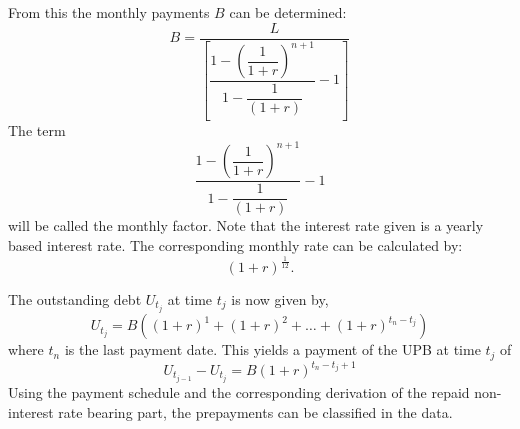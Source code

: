         From this the monthly payments $B$ can be determined: 
        \begin{equation}
            B = \dfrac{L}{
                    \left[
                        \dfrac{
                            1 - \left(
                                \dfrac{1}{1 + r}
                            \right)^{n+1}
                            }
                            {
                                1 - \dfrac{1}{(1 + r)}
                            } - 1
                    \right]        
                }
        \end{equation}
        The term 
        \begin{equation}
            \dfrac{
                1 - \left(
                    \dfrac{1}{1 + r}
                \right)^{n+1}
                }
                {
                    1 - \dfrac{1}{(1 + r)}
                } - 1
        \end{equation}
        will be called the monthly factor. 
        Note that the interest rate given is a yearly based interest rate. 
        The corresponding monthly rate can be calculated by: 
        \begin{equation}
            (1 + r)^{\frac{1}{12}}.
        \end{equation} 

        The outstanding debt $U_{t_j}$ at time $t_j$ is now given by,
        \begin{equation}
            U_{t_j} = B \left(
                (1+r)^1 + (1 + r)^2 + \ldots + (1 + r)^{t_n - t_j}
                \right)
        \end{equation}
        where $t_n$ is the last payment date. This yields a payment of the 
        UPB at time $t_j$ of
        \begin{equation}\label{upb_part}
            U_{t_{j-1}} - U_{t_{j}} = 
            B (1 + r)^{t_n - t_j + 1}  
        \end{equation}
        Using the payment schedule and the corresponding derivation of 
        the repaid non-interest rate bearing part, the prepayments 
        can be classified in the data. 
 
